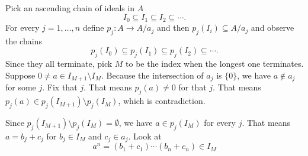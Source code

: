 \newcommand{\sheet}{5}




\maketitle

\begin{exercise}{1}
    Pick an ascending chain of ideals in $A$
    \begin{equation*}
        I_0 \subseteq I_1 \subseteq I_2 \subseteq \cdots.
    \end{equation*}
    For every $j = 1, \ldots, n$ define $p_j \colon A \rightarrow A / a_j$ and
    then $p_j(I_i) \subseteq A / a_j$ and observe the chains
    \begin{equation*}
        p_j(I_0) \subseteq p_j(I_1) \subseteq p_j(I_2) \subseteq \cdots.
    \end{equation*}
    Since they all terminate, pick $M$ to be the index when the longest one
    terminates. Suppose $0 \not= a \in I_{M+1} \setminus I_M$. Because the
    intersection of $a_j$ is $\{0\}$, we have $a \notin a_j$ for some $j$. Fix
    that $j$. That means $p_j(a) \not= 0$ for that $j$. That means $p_j(a) \in
    p_j(I_{M+1}) \setminus p_j(I_M)$, which is contradiction.

    Since $p_j(I_{M+1}) \setminus p_j(I_M) = \emptyset$, we have $a \in p_j(I_M)$
    for every $j$. That means $a = b_j + c_j$ for $b_j \in I_M$ and $c_j \in
    a_j$. Look at
    \begin{equation*}
        a^n = (b_1 + c_1) \cdots (b_n + c_n) \in I_M
    \end{equation*}
    \begin{equation*}

    \end{equation*}


\end{exercise}



